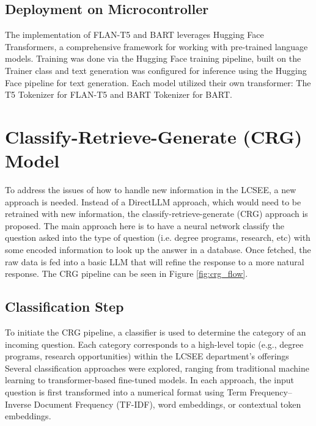 \documentclass[conference]{IEEEtran}
\begin{document}
\subsection{Deployment on Microcontroller}
The implementation of FLAN-T5 and BART leverages Hugging Face Transformers, a comprehensive framework for working with pre-trained language models.
Training was done via the Hugging Face training pipeline, built on the Trainer class and text generation was configured for inference using the Hugging Face pipeline for text generation.
Each model utilized their own transformer: The T5 Tokenizer \cite{b10} for FLAN-T5 and BART Tokenizer \cite{b11} for BART.



\section{Classify-Retrieve-Generate (CRG) Model}
To address the issues of how to handle new information in the LCSEE, a new approach is needed. 
Instead of a DirectLLM approach, which would need to be retrained with new information, the classify-retrieve-generate (CRG) approach is proposed. 
The main approach here is to have a neural network classify the question asked into the type of question (i.e. degree programs, research, etc) with some encoded information to look up the answer in a database. 
Once fetched, the raw data is fed into a basic LLM that will refine the response to a more natural response.
The CRG pipeline can be seen in Figure \ref{fig:crg_flow}.

\subsection{Classification Step}
To initiate the CRG pipeline, a classifier is used to determine the category of an incoming question. 
Each category corresponds to a high-level topic (e.g., degree programs, research opportunities) within the LCSEE department's offerings
Several classification approaches were explored, ranging from traditional machine learning to transformer-based fine-tuned models. 
In each approach, the input question is first transformed into a numerical format using Term Frequency–Inverse Document Frequency (TF-IDF), word embeddings, or contextual token embeddings.
\end{document}
